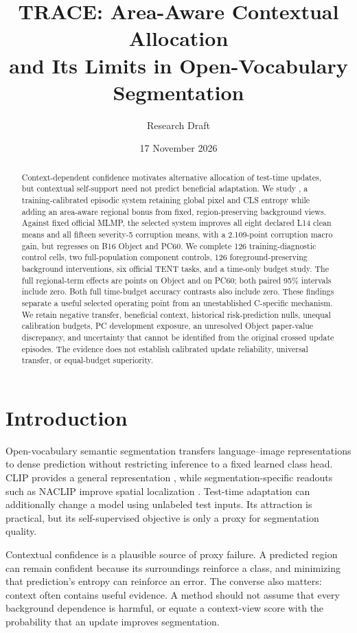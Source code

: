 \documentclass[10pt,twocolumn]{article}
\title{TRACE: Area-Aware Contextual Allocation\\
and Its Limits in Open-Vocabulary Segmentation}
\author{Research Draft}
\date{17 November 2026}
\begin{document}
\maketitle

\begin{abstract}
Context-dependent confidence motivates alternative allocation of test-time
updates, but contextual self-support need not predict beneficial adaptation.
We study \method, a training-calibrated episodic system retaining global pixel
and CLS entropy while adding an area-aware regional bonus from fixed,
region-preserving background views. Against fixed official MLMP, the selected
system improves all eight declared L14 clean means and all fifteen severity-5
corruption means, with a 2.109-point corruption macro gain, but regresses on
B16 Object and PC60. We complete 126 training-diagnostic control cells, two
full-population component controls, 126 foreground-preserving background
interventions, six official TENT tasks, and a time-only budget study.
The full regional-term effects are \ObjDelta{} points on Object and
\PCDelta{} on PC60; both paired 95\% intervals include zero. Both full
time-budget accuracy contrasts also include zero. These findings separate a
useful selected operating point from an unestablished C-specific mechanism.
We retain negative transfer, beneficial context, historical risk-prediction
nulls, unequal calibration budgets, PC development exposure, an unresolved
Object paper-value discrepancy, and uncertainty that cannot be identified
from the original crossed update episodes. The evidence does not establish
calibrated update reliability, universal transfer, or equal-budget superiority.
\end{abstract}

\section{Introduction}
Open-vocabulary semantic segmentation transfers language--image representations
to dense prediction without restricting inference to a fixed learned class
head. CLIP provides a general representation \citep{radford2021clip}, while
segmentation-specific readouts such as NACLIP improve spatial localization
\citep{hajimiri2025naclip}. Test-time adaptation can additionally change a
model using unlabeled test inputs. Its attraction is practical, but its
self-supervised objective is only a proxy for segmentation quality.

Contextual confidence is a plausible source of proxy failure. A predicted
region can remain confident because its surroundings reinforce a class, and
minimizing that prediction's entropy can reinforce an error. The converse
also matters: context often contains useful evidence. A method should not
assume that every background dependence is harmful, or equate a context-view
score with the probability that an update improves segmentation.
\end{document}

